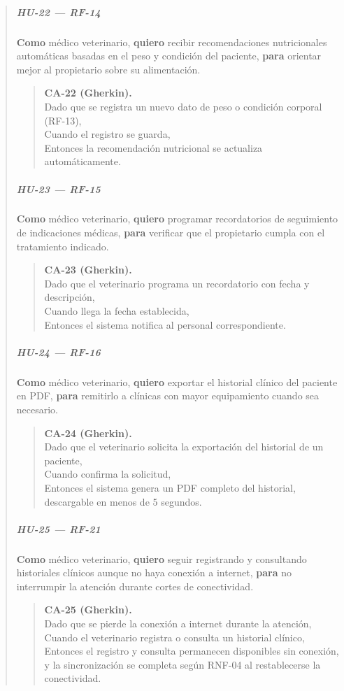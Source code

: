 \documentclass[
]{article}
\begin{document}
\begin{quote}
\subparagraph{HU-22 --- RF-14}
\textbf{Como} médico veterinario,
\textbf{quiero} recibir recomendaciones nutricionales automáticas basadas en el peso y condición del paciente,
\textbf{para} orientar mejor al propietario sobre su alimentación.

\begin{quote}
\textbf{CA-22 (Gherkin).} \\
Dado que se registra un nuevo dato de peso o condición corporal (RF-13), \\
Cuando el registro se guarda, \\
Entonces la recomendación nutricional se actualiza automáticamente.
\end{quote}

\subparagraph{HU-23 --- RF-15}
\textbf{Como} médico veterinario,
\textbf{quiero} programar recordatorios de seguimiento de indicaciones médicas,
\textbf{para} verificar que el propietario cumpla con el tratamiento indicado.

\begin{quote}
\textbf{CA-23 (Gherkin).} \\
Dado que el veterinario programa un recordatorio con fecha y descripción, \\
Cuando llega la fecha establecida, \\
Entonces el sistema notifica al personal correspondiente.
\end{quote}

\subparagraph{HU-24 --- RF-16}
\textbf{Como} médico veterinario,
\textbf{quiero} exportar el historial clínico del paciente en PDF,
\textbf{para} remitirlo a clínicas con mayor equipamiento cuando sea necesario.

\begin{quote}
\textbf{CA-24 (Gherkin).} \\
Dado que el veterinario solicita la exportación del historial de un paciente, \\
Cuando confirma la solicitud, \\
Entonces el sistema genera un PDF completo del historial, descargable en menos de 5 segundos.
\end{quote}

\subparagraph{HU-25 --- RF-21}
\textbf{Como} médico veterinario,
\textbf{quiero} seguir registrando y consultando historiales clínicos aunque no haya conexión a internet,
\textbf{para} no interrumpir la atención durante cortes de conectividad.

\begin{quote}
\textbf{CA-25 (Gherkin).} \\
Dado que se pierde la conexión a internet durante la atención, \\
Cuando el veterinario registra o consulta un historial clínico, \\
Entonces el registro y consulta permanecen disponibles sin conexión, y la sincronización se completa según RNF-04 al restablecerse la conectividad.
\end{quote}


\end{quote}
\end{document}

